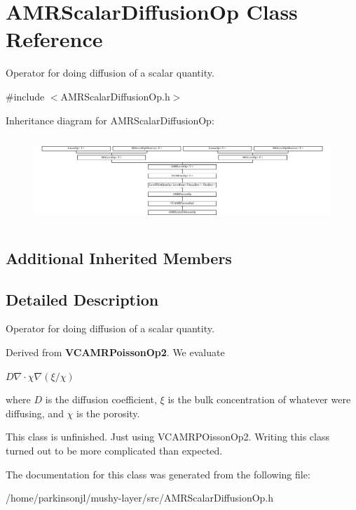 \hypertarget{class_a_m_r_scalar_diffusion_op}{}\section{A\+M\+R\+Scalar\+Diffusion\+Op Class Reference}
\label{class_a_m_r_scalar_diffusion_op}


Operator for doing diffusion of a scalar quantity.  




{\ttfamily \#include $<$A\+M\+R\+Scalar\+Diffusion\+Op.\+h$>$}

Inheritance diagram for A\+M\+R\+Scalar\+Diffusion\+Op\+:\begin{figure}[H]
\begin{center}
\leavevmode
\includegraphics[height=3.274854cm]{class_a_m_r_scalar_diffusion_op}
\end{center}
\end{figure}
\subsection*{Additional Inherited Members}


\subsection{Detailed Description}
Operator for doing diffusion of a scalar quantity. 

Derived from \textbf{ V\+C\+A\+M\+R\+Poisson\+Op2}. We evaluate

$ D \nabla \cdot \chi \nabla (\xi/\chi) $

where $D$ is the diffusion coefficient, $ \xi$ is the bulk concentration of whatever we\textquotesingle{}re diffusing, and $ \chi$ is the porosity.

This class is unfinished. Just using V\+C\+A\+M\+R\+P\+Oisson\+Op2. Writing this class turned out to be more complicated than expected. 

The documentation for this class was generated from the following file\+:\begin{DoxyCompactItemize}
\item 
/home/parkinsonjl/mushy-\/layer/src/A\+M\+R\+Scalar\+Diffusion\+Op.\+h\end{DoxyCompactItemize}

